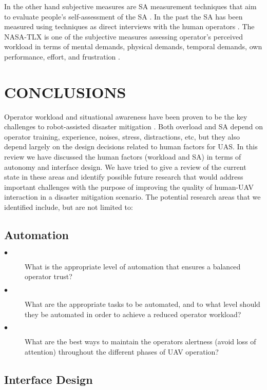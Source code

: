 \documentclass[12pt, letterpaper, oneside]{article}
\begin{document}
In the other hand subjective measures are SA measurement techniques that aim to evaluate people's self-assessment of the SA \cite{12}. In the past the SA has been measured using techniques as direct interviews with the human operators \cite{7}. The NASA-TLX is one of the subjective measures assessing operator's perceived workload in terms of mental demands, physical demands, temporal demands, own performance, effort, and frustration \cite{29}. 

\section{CONCLUSIONS}
Operator workload and situational awareness have been proven to be the key challenges to robot-assisted disaster mitigation \cite{18}. Both overload and SA depend on operator training, experience, noises, stress, distractions, etc, but they also depend largely on the design decisions related to human factors for UAS. In this review we have discussed the human factors (workload and SA) in terms of autonomy and interface design. We have tried to give a review of the current state in these areas and identify possible future research that would address important challenges with the purpose of improving the quality of human-UAV interaction in a disaster mitigation scenario. The potential research areas that we identified include, but are not limited to:

\subsection{Automation}

\begin{description}
	\item[$\bullet$] 
	What is the appropriate level of automation that ensures a balanced operator trust? 
	\item[$\bullet$] 
	What are the appropriate tasks to be automated, and to what level should they be automated in order to achieve a reduced operator workload?
	\item[$\bullet$] 
	What are the best ways to maintain the operators alertness (avoid loss of attention) throughout the different phases of UAV operation? 
\end{description}

\subsection{Interface Design}
\end{document}
